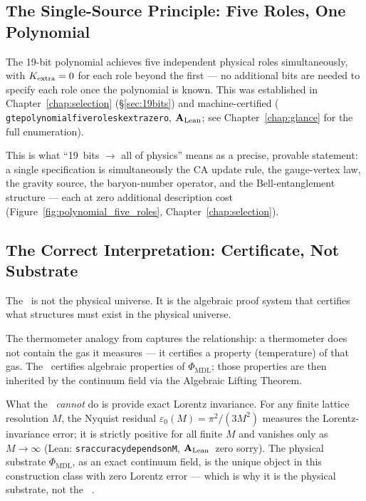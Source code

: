 \documentclass[11pt,openany]{book}
\theoremstyle{remark}
\newcommand{\PHIMDL}{\Phi_{\mathrm{MDL}}}
\newcommand{\lean}[1]{%
  \penalty-100
  \begingroup\def\_{\textunderscore\allowbreak}\texttt{#1}\endgroup}
\newcommand{\CMCA}{\text{CMCA}}
\newcommand{\CatAL}{\ensuremath{\textbf{A}_{\rm Lean}}}
\begin{document}
\subsection*{The Single-Source Principle: Five Roles, One Polynomial}

The 19-bit polynomial achieves five independent physical roles simultaneously, with
$K_{\rm extra} = 0$ for each role beyond the first --- no additional bits are needed
to specify each role once the polynomial is known.
This was established in Chapter~\ref{chap:selection} (\S\ref{sec:19bits}) and
machine-certified (\lean{gte\_polynomial\_five\_roles\_k\_extra\_zero}, \CatAL;
see Chapter~\ref{chap:glance} for the full enumeration).

\noindent
This is what ``19~bits $\to$ all of physics'' means as a precise, provable statement:
a single specification is simultaneously the CA update rule, the gauge-vertex law,
the gravity source, the baryon-number operator, and the Bell-entanglement structure ---
each at zero additional description cost
(Figure~\ref{fig:polynomial_five_roles}, Chapter~\ref{chap:selection}).

\subsection*{The Correct Interpretation: Certificate, Not Substrate}

The \CMCA\ is not the physical universe.
It is the algebraic proof system that certifies what structures must exist in the
physical universe.

The thermometer analogy from \cite{SpivackThreeTapeCMCA} captures the relationship:
a thermometer does not contain the gas it measures --- it certifies a property
(temperature) of that gas.
The \CMCA\ certifies algebraic properties of $\PHIMDL$; those properties are then
inherited by the continuum field via the Algebraic Lifting Theorem.

What the \CMCA\ \emph{cannot} do is provide exact Lorentz invariance.
For any finite lattice resolution $M$, the Nyquist residual
$\varepsilon_0(M) = \pi^2/(3M^2)$ measures the Lorentz-invariance error;
it is strictly positive for all finite $M$ and vanishes only as $M\to\infty$
(Lean: \lean{sr\_accuracy\_depends\_on\_M}, \CatAL\ zero sorry).
The physical substrate $\PHIMDL$, as an exact continuum field, is the unique
object in this construction class with zero Lorentz error --- which is why it
is the physical substrate, not the \CMCA\ \cite{SpivackCompleteness}.
\end{document}
